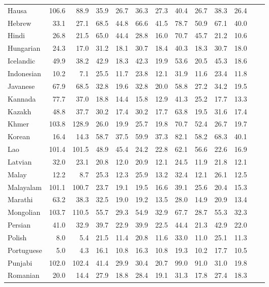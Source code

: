 {\begin{table}[h!]
\begin{scriptsize}
\begin{tabular}{lrrrrrrrrrrrr}
Hausa & 106.6 & 88.9 & 35.9 & 26.7 & 36.3 & 27.3 & 40.4 & 26.7 & 38.3 & 26.4\\
Hebrew & 33.1 & 27.1 & 68.5 & 44.8 & 66.6 & 41.5 & 78.7 & 50.9 & 67.1 & 40.0\\
Hindi & 26.8 & 21.5 & 65.0 & 44.4 & 28.8 & 16.0 & 70.7 & 45.7 & 21.2 & 10.6\\
Hungarian & 24.3 & 17.0 & 31.2 & 18.1 & 30.7 & 18.4 & 40.3 & 18.3 & 30.7 & 18.0\\
Icelandic & 49.9 & 38.2 & 42.9 & 18.3 & 42.3 & 19.9 & 53.6 & 20.5 & 45.3 & 18.6\\
Indonesian & 10.2 & 7.1 & 25.5 & 11.7 & 23.8 & 12.1 & 31.9 & 11.6 & 23.4 & 11.8\\
Javanese & 67.9 & 68.5 & 32.8 & 19.6 & 32.8 & 20.0 & 58.8 & 27.2 & 34.2 & 19.5\\
Kannada & 77.7 & 37.0 & 18.8 & 14.4 & 15.8 & 12.9 & 41.3 & 25.2 & 17.7 & 13.3\\
Kazakh & 48.8 & 37.7 & 30.2 & 17.4 & 30.2 & 17.7 & 63.8 & 19.5 & 31.6 & 17.4\\
Khmer & 103.8 & 128.9 & 26.0 & 19.9 & 25.7 & 19.8 & 70.7 & 52.4 & 26.7 & 19.7\\
Korean & 16.4 & 14.3 & 58.7 & 37.5 & 59.9 & 37.3 & 82.1 & 58.2 & 68.3 & 40.1\\
Lao & 101.4 & 101.5 & 48.9 & 45.4 & 24.2 & 22.8 & 62.1 & 56.6 & 22.6 & 16.9\\
Latvian & 32.0 & 23.1 & 20.8 & 12.0 & 20.9 & 12.1 & 24.5 & 11.9 & 21.8 & 12.1\\
Malay & 12.2 & 8.7 & 25.3 & 12.3 & 25.9 & 13.2 & 32.4 & 12.1 & 26.1 & 12.5\\
Malayalam & 101.1 & 100.7 & 23.7 & 19.1 & 19.5 & 16.6 & 39.1 & 25.6 & 20.4 & 15.3\\
Marathi & 63.2 & 38.3 & 32.5 & 19.0 & 19.2 & 13.5 & 28.0 & 14.9 & 20.9 & 13.4\\
Mongolian & 103.7 & 110.5 & 55.7 & 29.3 & 54.9 & 32.9 & 67.7 & 28.7 & 55.3 & 32.3\\
Persian & 41.0 & 32.9 & 39.7 & 22.9 & 39.9 & 22.5 & 44.4 & 21.3 & 42.9 & 22.0\\
Polish & 8.0 & 5.4 & 21.5 & 11.4 & 20.8 & 11.6 & 33.0 & 11.0 & 25.1 & 11.3\\
Portuguese & 5.0 & 4.3 & 16.1 & 10.8 & 16.3 & 10.8 & 19.3 & 10.2 & 17.7 & 10.5\\
Punjabi & 102.0 & 102.4 & 41.4 & 29.9 & 30.4 & 20.7 & 99.0 & 91.0 & 31.0 & 19.8\\
Romanian & 20.0 & 14.4 & 27.9 & 18.8 & 28.4 & 19.1 & 31.3 & 17.8 & 27.4 & 18.3\\

\end{tabular}
\end{scriptsize}
\end{table}}
